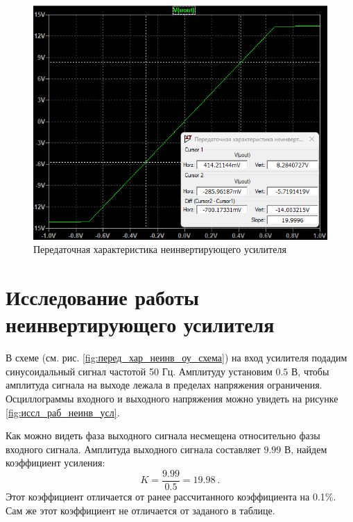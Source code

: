 \begin{figure}[H]
    \centering
    \includegraphics[width=\textwidth]{figs/перед_хар_неинв_оу.png}
    \caption{Передаточная характеристика неинвертирующего усилителя}
    \label{fig:перед_хар_неинв_оу}
\end{figure}


\section*{Исследование работы неинвертирующего усилителя}

В схеме (см. рис. \ref{fig:перед_хар_неинв_оу_схема}) на вход усилителя подадим 
синусоидальный сигнал частотой 50 Гц. Амплитуду установим $0.5$ В, чтобы амплитуда
сигнала на выходе лежала в пределах напряжения ограничения. Осциллограммы входного
и выходного напряжения можно увидеть на рисунке \ref{fig:иссл_раб_неинв_усл}.

Как можно видеть фаза выходного сигнала несмещена относительно фазы входного сигнала. 
Амплитуда выходного сигнала составляет $9.99$ В, найдем
коэффициент усиления:
\begin{equation*}
    K=\frac{9.99}{0.5}=19.98\ .
\end{equation*}
Этот коэффициент отличается от ранее рассчитанного коэффициента на 0.1\%.
Сам же этот коэффициент не отличается от заданого в таблице.

